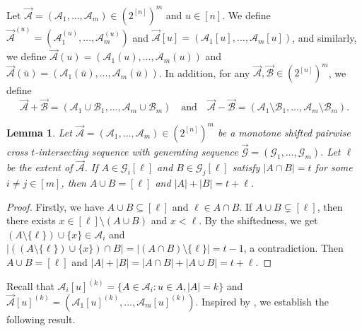 \documentclass[11pt,a4paper]{article}
\newtheorem{lemma}[theorem]{Lemma}
\begin{document}
Let $\vec{\mathcal{A}} = (\mathcal{A}_1, \ldots, \mathcal{A}_m)\in (2^{[n]})^{m}$ and $u\in [n]$. 
We define
 $\vec{\mathcal{A}}^{(u)}=(\mathcal{A}_1^{(u)},\ldots, \mathcal{A}_m^{(u)})$ and $\vec{\mathcal{A}}[u]=(\mathcal{A}_1[u],\ldots, \mathcal{A}_m[u])$, and similarly, we define $\vec{\mathcal{A}}(u)=(\mathcal{A}_1(u),\ldots, \mathcal{A}_m(u))$ and $\vec{\mathcal{A}}(\bar{u})=(\mathcal{A}_1(\bar{u}),\ldots, \mathcal{A}_m(\bar{u}))$.
In addition, for any $\vec{\mathcal{A}}, \vec{\mathcal{B}}\in (2^{[n]})^{m}$, we define
$$ \vec{\mathcal{A}} + \vec{\mathcal{B}} = (\mathcal{A}_1 \cup \mathcal{B}_1, \ldots, \mathcal{A}_m \cup \mathcal{B}_m) \quad \text{and} \quad \vec{\mathcal{A}}- \vec{\mathcal{B}} = (\mathcal{A}_1\setminus\mathcal{B}_1, \ldots, \mathcal{A}_m \setminus \mathcal{B}_m). $$
 








\begin{lemma}\label{le2}
 Let $\vec{\mathcal{A}} = (\mathcal{A}_1, \ldots, \mathcal{A}_m) \in (2^{[n]})^{m}$ be  a monotone shifted pairwise cross $t$-intersecting sequence with  generating sequence  $\vec{\mathcal{G}} = (\mathcal{G}_1, \ldots, \mathcal{G}_m)$. Let $\ell$ be the extent of $\vec{\mathcal{A}}$. If 
$A\in \mathcal{G}_i[\ell]$ and  $B\in \mathcal{G}_j[\ell]$  satisfy $|A\cap B|=t$ for some $i\neq j\in [m]$, then $A\cup B=[\ell]$ and $|A|+|B|=t+\ell$.
\end{lemma}
\begin{proof}
Firstly, we have $A\cup B\subseteq[\ell]$ and $\ell\in A\cap B$. If $A\cup B\subsetneq[\ell]$, then there exists  $x\in[\ell]\setminus(A\cup B)$ and $x<\ell$. By the shiftedness, we get $(A\setminus\{\ell\})\cup\{x\}\in\mathcal{A}_i$ 
and $|((A\setminus\{\ell\})\cup\{x\})\cap B|=|(A\cap B)\setminus\{\ell\}|=t-1$, a contradiction. Then $A\cup B=[\ell]$ and $|A|+|B|=|A\cap B|+|A\cup B|=t+\ell$.
\end{proof}


Recall that $ 
\mathcal{A}_i[u]^{(k)}=\{A\in\mathcal{A}_i: u\in A,|A|=k\}$ 
and
$\vec{\mathcal{A}}[u]^{(k)}=(\mathcal{A}_1[u]^{(k)},\ldots, \mathcal{A}_m[u]^{(k)})$. Inspired by \cite[Lemma 3.1]{L25}, we establish the following result.
\end{document}
